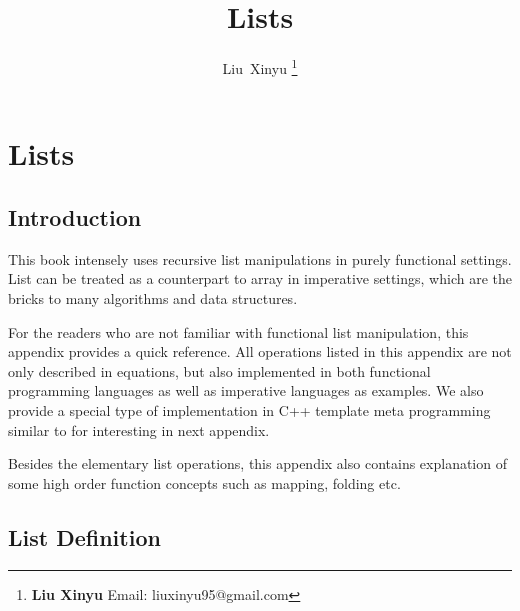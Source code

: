 \documentclass{article}
\begin{document}
\fi


\title{Lists}

\author{Liu~Xinyu
\thanks{{\bfseries Liu Xinyu } \newline
  Email: liuxinyu95@gmail.com \newline}
  }


\maketitle

\ifx\wholebook\relax
\chapter{Lists}
\fi

\section{Introduction}
\label{introduction}
This book intensely uses recursive list manipulations in purely functional settings.
List can be treated as a counterpart to array in imperative settings, which are the
bricks to many algorithms and data structures.

For the readers who are not familiar with functional list manipulation, this appendix
provides a quick reference. All operations listed in this appendix are not only
described in equations, but also implemented in both functional programming languages
as well as imperative languages as examples. We also provide a special type of
implementation in C++ template meta programming similar to \cite{moderncxx}
for interesting in next appendix.

Besides the elementary list operations, this appendix also contains explanation of 
some high order function concepts such as mapping, folding etc.


\section{List Definition}
\end{document}
